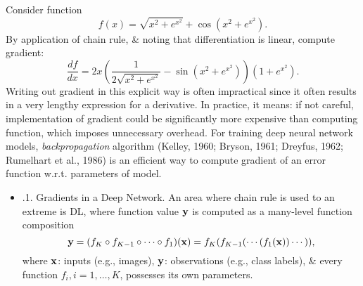 \documentclass{article}
\begin{document}
\begin{enumerate}
\begin{itemize}
\begin{itemize}
			Consider function
			\begin{equation}
				f(x) = \sqrt{x^2 + e^{x^2}} + \cos(x^2 + e^{x^2}).
			\end{equation}
			By application of chain rule, \& noting that differentiation is linear, compute gradient:
			\begin{equation}
				\frac{df}{dx} = 2x\left(\dfrac{1}{2\sqrt{x^2 + e^{x^2}}} - \sin(x^2 + e^{x^2})\right)(1 + e^{x^2}).
			\end{equation}
			Writing out gradient in this explicit way is often impractical since it often results in a very lengthy expression for a derivative. In practice, it means: if not careful, implementation of gradient could be significantly more expensive than computing function, which imposes unnecessary overhead. For training deep neural network models, {\it backpropagation} algorithm (Kelley, 1960; Bryson, 1961; Dreyfus, 1962; Rumelhart et al., 1986) is an efficient way to compute gradient of an error function w.r.t. parameters of model.
			\begin{itemize}
				\item {.1. Gradients in a Deep Network.} An area where chain rule is used to an extreme is DL, where function value ${\bf y}$ is computed as a many-level function composition
				\begin{equation}
					{\bf y} = (f_K\circ f_{K-1}\circ\cdots\circ f_1)({\bf x}) = f_K(f_{K-1}(\cdots(f_1({\bf x}))\cdots)),
				\end{equation}
				where ${\bf x}$: inputs (e.g., images), ${\bf y}$: observations (e.g., class labels), \& every function $f_i,i = 1,\ldots,K$, possesses its own parameters.
				

\end{itemize}
\end{itemize}
\end{itemize}
\end{enumerate}
\end{document}
